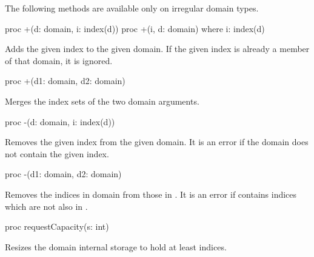 The following methods are available only on irregular domain types.

\begin{protohead}
proc +(d: domain, i: index(d))
proc +(i, d: domain) where i: index(d)
\end{protohead}
\begin{protobody}
Adds the given index to the given domain.  If the given index is already a
member of that domain, it is ignored.
\end{protobody}

\begin{protohead}
proc +(d1: domain, d2: domain)
\end{protohead}
\begin{protobody}
Merges the index sets of the two domain arguments.
\end{protobody}

\begin{protohead}
proc -(d: domain, i: index(d))
\end{protohead}
\begin{protobody}
Removes the given index from the given domain.  It is an error if the domain
does not contain the given index.
\end{protobody}

\begin{protohead}
proc -(d1: domain, d2: domain)
\end{protohead}
\begin{protobody}
Removes the indices in domain  from those in .  It is an error
if  contains indices which are not also in .
\end{protobody}

\begin{protohead}
proc requestCapacity(s: int)
\end{protohead}
\begin{protobody}
Resizes the domain internal storage to hold at least  indices.
\end{protobody}

